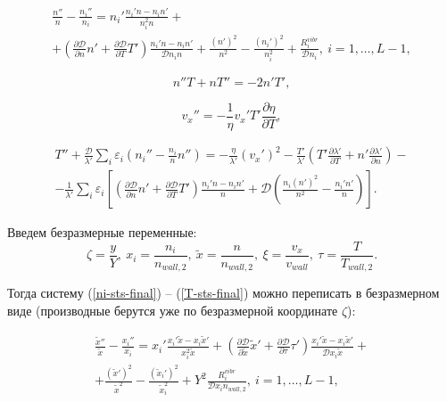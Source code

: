 \documentclass[12pt]{article}
\begin{document}
\begin{multline}
\frac{n''}{n} - \frac{n_{i}''}{n_{i}} = 
  n_{i}' \frac{n_{i}'n - n_{i}n'}{n_{i}^2 n} + \\
  + \left(\frac{\partial \mathcal{D}}{\partial n}n' + \frac{\partial \mathcal{D}}{\partial T}T' \right) \frac{n_{i}'n - n_{i}n'}{\mathcal{D}n_{i}n} + \frac{\left(n'\right)^2}{n^2} - \frac{\left(n_{i}'\right)^2}{n_{i}^2} + \frac{R_{i}^{vibr}}{\mathcal{D}n_{i}},\:i=1,\ldots,L-1,\label{ni-sts-final}
\end{multline}

\begin{equation}
  n''T + nT'' = -2n'T',
\end{equation}

\begin{equation}
  v_{x}'' = -\frac{1}{\eta} v_{x}' T' \frac{\partial \eta}{\partial T},
\end{equation}

\begin{multline}
  T'' + \frac{\mathcal{D}}{\lambda'}\sum_{i}\varepsilon_{i}\left(n_{i}'' - \frac{n_{i}}{n}n'' \right) = -\frac{\eta}{\lambda'} \left(v_{x}' \right)^2 - \frac{T'}{\lambda'} \left(T' \frac{\partial \lambda'}{\partial T} + n' \frac{\partial \lambda'}{\partial n} \right) - \\
  - \frac{1}{\lambda'}\sum_{i}\varepsilon_{i} \left[\left(\frac{\partial \mathcal{D}}{\partial n}n' + \frac{\partial \mathcal{D}}{\partial T}T' \right) \frac{n_{i}'n - n_{i}n'}{n} + \mathcal{D}\left(\frac{n_{i}\left(n'\right)^2}{n^2} - \frac{n_{i}'n'}{n} \right)  \right].\label{T-sts-final}
\end{multline}

Введем безразмерные переменные:
\begin{equation}
  \zeta = \frac{y}{Y},\:x_{i} = \frac{n_{i}}{n_{wall,2}},\:\tilde{x}=\frac{n}{n_{wall,2}},\:\xi=\frac{v_{x}}{v_{wall}},\:\tau=\frac{T}{T_{wall,2}}.
\end{equation}

Тогда систему (\ref{ni-sts-final}) -- (\ref{T-sts-final}) можно переписать в безразмерном виде (производные берутся уже по безразмерной координате $\zeta$):

\begin{multline}
\frac{\tilde{x}''}{\tilde{x}} - \frac{x_{i}''}{x_{i}} = 
  x_{i}' \frac{x_{i}'\tilde{x} - x_{i}\tilde{x}'}{x_{i}^2 \tilde{x}} + \left(\frac{\partial \mathcal{D}}{\partial \tilde{x}}\tilde{x}' + \frac{\partial \mathcal{D}}{\partial \tau}\tau' \right) \frac{x_{i}'\tilde{x} - x_{i}\tilde{x}'}{\mathcal{D}x_{i}\tilde{x}} + \\
  + \frac{\left(\tilde{x}'\right)^2}{\tilde{x}^2} - \frac{\left(\tilde{x}_{i}'\right)^2}{\tilde{x}_{i}^2} + Y^{2}\frac{R_{i}^{vibr}}{\mathcal{D}x_{i}n_{wall,2}},\:i=1,\ldots,L-1,\label{ni-sts-final-dimless}
\end{multline}
\end{document}
